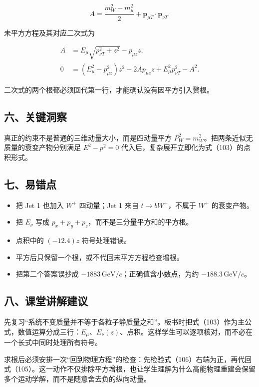 \documentclass[12pt,a4paper,UTF8]{ctexart}
\newcommand{\tightlist}{\setlength{\itemsep}{0pt}\setlength{\parskip}{0pt}}
\begin{document}
\[A=\frac{m_W^2-m_\mu^2}{2}
+\boldsymbol p_{\mu T}\cdot\boldsymbol p_{\nu T}.\]

未平方方程及其对应二次式为

\[\begin{aligned}
A&=E_\mu\sqrt{p_{\nu T}^2+z^2}-p_{\mu z}z,\\
0&=(E_\mu^2-p_{\mu z}^2)z^2
-2Ap_{\mu z}z+E_\mu^2p_{\nu T}^2-A^2.
\end{aligned}\]

二次式的两个根都必须回代第一行，才能确认没有因平方引入赘根。

\subsection{六、关键洞察}\label{ux516dux5173ux952eux6d1eux5bdf-7}

真正的约束不是普通的三维动量大小，而是四动量平方
\(P_W^2=m_W^2\)。把两条近似无质量的衰变产物分别满足 \(E^2-p^2=0\)
代入后，复杂展开立即化为式（103）的点积形式。

\subsection{七、易错点}\label{ux4e03ux6613ux9519ux70b9-7}

\begin{itemize}
\tightlist
\item
  把 Jet 1 也加入 \(W^+\) 四动量；Jet 1 来自 \(t\to bW^+\)，不属于
  \(W^+\) 的衰变产物。
\item
  把 \(E_\nu\) 写成 \(p_x+p_y+p_z\)，而不是三分量平方和的平方根。
\item
  点积中的 \((-12.4)z\) 符号处理错误。
\item
  平方后只保留一个根，或不代回未平方方程检查增根。
\item
  把第二个答案误抄成 \(-1883\,\mathrm{GeV}/c\)；正确值含小数点，为约
  \(-188.3\,\mathrm{GeV}/c\)。
\end{itemize}

\subsection{八、课堂讲解建议}\label{ux516bux8bfeux5802ux8bb2ux89e3ux5efaux8bae-7}

先复习``系统不变质量并不等于各粒子静质量之和''。板书时把式（103）作为主公式，数值运算分成三行：\(E_\mu\)、\(E_\nu(z)\)、点积。这样学生可以逐项核对，而不必在一个长式中同时处理所有符号。

求根后必须安排一次``回到物理方程''的检查：先检验式（106）右端为正，再代回式（105）。这一动作不仅排除平方增根，也让学生理解为什么高能物理重建会保留多个运动学解，而不是随意舍去负的纵向动量。
\end{document}
